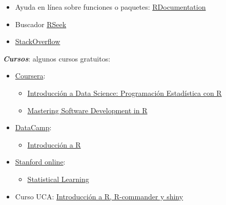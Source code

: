 \documentclass[]{book}
\providecommand{\tightlist}{%
  \setlength{\itemsep}{0pt}\setlength{\parskip}{0pt}}
\begin{document}
\begin{itemize}
\item
  Ayuda en línea sobre funciones o paquetes: \href{https://www.rdocumentation.org/}{RDocumentation}
\item
  Buscador \href{http://rseek.org/}{RSeek}
\item
  \href{http://stackoverflow.com/questions/tagged/r}{StackOverflow}
\end{itemize}

\textbf{\emph{Cursos}}:
algunos cursos gratuitos:

\begin{itemize}
\item
  \href{https://www.coursera.org/}{Coursera}:

  \begin{itemize}
  \item
    \href{https://www.coursera.org/learn/intro-data-science-programacion-estadistica-r}{Introducción a Data Science: Programación Estadística con R}
  \item
    \href{https://www.coursera.org/specializations/r}{Mastering Software Development in R}
  \end{itemize}
\end{itemize}

\begin{itemize}
\item
  \href{https://www.datacamp.com/courses}{DataCamp}:

  \begin{itemize}
  \tightlist
  \item
    \href{https://www.datacamp.com/courses/introduccion-a-r/}{Introducción a R}
  \end{itemize}
\end{itemize}

\begin{itemize}
\item
  \href{http://online.stanford.edu/courses}{Stanford online}:

  \begin{itemize}
  \tightlist
  \item
    \href{http://online.stanford.edu/course/statistical-learning}{Statistical Learning}
  \end{itemize}
\end{itemize}

\begin{itemize}
\tightlist
\item
  Curso UCA: \href{http://knuth.uca.es/moodle/course/view.php?id=51}{Introducción a R, R-commander y shiny}
\end{itemize}
\end{document}
